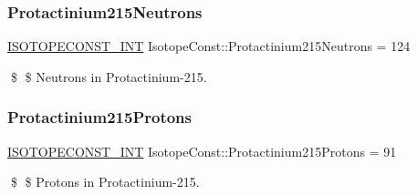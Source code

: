 \subsubsection{\texorpdfstring{Protactinium215\+Neutrons}{Protactinium215Neutrons}}
{\footnotesize\ttfamily \mbox{\hyperlink{group___isotope_const-_macros_ga5f18360b3e99483a35c32d789e62621c}{I\+S\+O\+T\+O\+P\+E\+C\+O\+N\+S\+T\+\_\+\+I\+NT}} Isotope\+Const\+::\+Protactinium215\+Neutrons = 124}

\$ \$ Neutrons in Protactinium-\/215. \mbox{\label{group___isotope_const-_protactinium-_pa215_gae4065437ca8e1b74df6117d09800fc3c}} 
\subsubsection{\texorpdfstring{Protactinium215\+Protons}{Protactinium215Protons}}
{\footnotesize\ttfamily \mbox{\hyperlink{group___isotope_const-_macros_ga5f18360b3e99483a35c32d789e62621c}{I\+S\+O\+T\+O\+P\+E\+C\+O\+N\+S\+T\+\_\+\+I\+NT}} Isotope\+Const\+::\+Protactinium215\+Protons = 91}

\$ \$ Protons in Protactinium-\/215. 